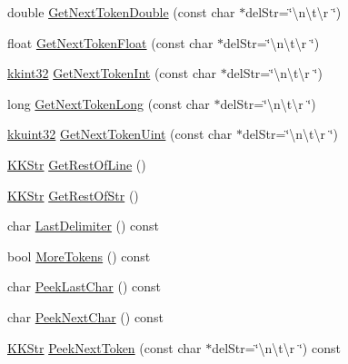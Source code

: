 \begin{DoxyCompactItemize}
\item 
double \hyperlink{class_k_k_b_1_1_k_k_str_parser_a5a7993d387c6d475efbd1c7367f0fb7c}{Get\+Next\+Token\+Double} (const char $\ast$del\+Str=\char`\"{}\textbackslash{}n\textbackslash{}t\textbackslash{}r \char`\"{})
\item 
float \hyperlink{class_k_k_b_1_1_k_k_str_parser_ab2328419a6ca4c74b3bc641ad6d922e0}{Get\+Next\+Token\+Float} (const char $\ast$del\+Str=\char`\"{}\textbackslash{}n\textbackslash{}t\textbackslash{}r \char`\"{})
\item 
\hyperlink{namespace_k_k_b_a8fa4952cc84fda1de4bec1fbdd8d5b1b}{kkint32} \hyperlink{class_k_k_b_1_1_k_k_str_parser_a99f21d7feec263b53178b10bbca8ef38}{Get\+Next\+Token\+Int} (const char $\ast$del\+Str=\char`\"{}\textbackslash{}n\textbackslash{}t\textbackslash{}r \char`\"{})
\item 
long \hyperlink{class_k_k_b_1_1_k_k_str_parser_aabbe674ef3691bb997942f39a02919dc}{Get\+Next\+Token\+Long} (const char $\ast$del\+Str=\char`\"{}\textbackslash{}n\textbackslash{}t\textbackslash{}r \char`\"{})
\item 
\hyperlink{namespace_k_k_b_af8d832f05c54994a1cce25bd5743e19a}{kkuint32} \hyperlink{class_k_k_b_1_1_k_k_str_parser_a2e4af04433f60d474871d90d83f4752d}{Get\+Next\+Token\+Uint} (const char $\ast$del\+Str=\char`\"{}\textbackslash{}n\textbackslash{}t\textbackslash{}r \char`\"{})
\item 
\hyperlink{class_k_k_b_1_1_k_k_str}{K\+K\+Str} \hyperlink{class_k_k_b_1_1_k_k_str_parser_a1792f00ba50c9c8fc990248a052997e1}{Get\+Rest\+Of\+Line} ()
\item 
\hyperlink{class_k_k_b_1_1_k_k_str}{K\+K\+Str} \hyperlink{class_k_k_b_1_1_k_k_str_parser_a5a36bdebbb082403db0c92348f126a39}{Get\+Rest\+Of\+Str} ()
\item 
char \hyperlink{class_k_k_b_1_1_k_k_str_parser_a94660c28f9c18938914d20adb640c1a4}{Last\+Delimiter} () const 
\item 
bool \hyperlink{class_k_k_b_1_1_k_k_str_parser_a4a2eb79f712e5993379c93dc16059332}{More\+Tokens} () const 
\item 
char \hyperlink{class_k_k_b_1_1_k_k_str_parser_a2e81869142abfe060786cb358a2e82ca}{Peek\+Last\+Char} () const 
\item 
char \hyperlink{class_k_k_b_1_1_k_k_str_parser_a2086ce83af683571ac79d9e0b517975f}{Peek\+Next\+Char} () const 
\item 
\hyperlink{class_k_k_b_1_1_k_k_str}{K\+K\+Str} \hyperlink{class_k_k_b_1_1_k_k_str_parser_a5492be515d0d7968eb16f3353c7b1283}{Peek\+Next\+Token} (const char $\ast$del\+Str=\char`\"{}\textbackslash{}n\textbackslash{}t\textbackslash{}r \char`\"{}) const 

\end{DoxyCompactItemize}
